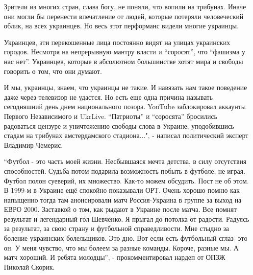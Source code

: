 Зрители из многих стран, слава богу, не поняли, что вопили на трибунах. Иначе
они могли бы перенести впечатление от людей, которые потеряли человеческий
облик, на всех украинцев. Но весь этот перформанс видели многие украинцы.

Украинцев, эти перекошенные лица постоянно видят на улицах украинских городов.
Несмотря на непрерывную мантру власти и \enquote{соросят}, что \enquote{фашизма
у нас нет}.  Украинцев, которые в абсолютном большинстве хотят мира и свободы
говорить о том, что они думают.

И мы, украинцы, знаем, что украинцы не такие. И навязать нам такое поведение
даже через телевизор не удастся. Но есть еще одна причина называть сегодняшний
день днем национального позора. YouTube заблокировал аккаунты Первого
Независимого и UkrLive. \enquote{Патриоты} и \enquote{соросята} бросились
радоваться цензуре и уничтожению свободы слова в Украине, уподобившись стадам
на трибунах амстердамского стадиона...", - написал политический эксперт
Владимир Чемерис.


\enquote{Футбол - это часть моей жизни. Несбывшаяся мечта детства, в силу отсутствия
способностей. Судьба потом подарила возможность побыть в футболе, не играя.
Футбол полон суеверий, их множество. Как-то можем обсудить. Пост не об этом. В
1999-м в Украине ещё спокойно показывали ОРТ. Очень хорошо помню как напыщенно
тогда там анонсировали матч Россия-Украина в группе за выход на ЕВРО 2000.
Заставкой о том, как рыдают в Украине после матча. Все помнят результат и
легендарный гол Шевченко. Я прыгал до потолка от радости. Радуясь за результат,
за свою страну и футбольной справедливости. Мне стыдно за боление украинских
болельщиков. Это дно. Вот если есть футбольный сглаз- это он. У меня чувство,
что мы болеем за разные команды. Короче, разные мы. А матч хороший. И ребята
молодцы}, - прокомментировал нардеп от ОПЗЖ Николай Скорик.

